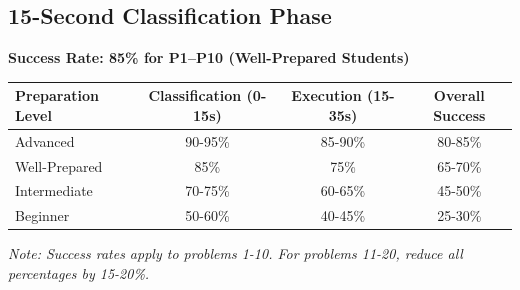 \documentclass{article}
\begin{document}
\newpage

\subsection{15-Second Classification Phase}
{\footnotesize\textcolor{timegreen}{}}\quad\textbf{Success Rate: 85\% for P1--P10 (Well-Prepared Students)}\\
\hypertarget{classify-15}{}

\begin{tcolorbox}[colback=blue!5!white,colframe=blue!75!black,title={\textbf{Success Rate Variations by Preparation Level}}]
\begin{center}
\begin{tabular}{|l|c|c|c|}
\hline
\textbf{Preparation Level} & \textbf{Classification (0-15s)} & \textbf{Execution (15-35s)} & \textbf{Overall Success} \\
\hline
Advanced & 90-95\% & 85-90\% & 80-85\% \\
Well-Prepared & 85\% & 75\% & 65-70\% \\
Intermediate & 70-75\% & 60-65\% & 45-50\% \\
Beginner & 50-60\% & 40-45\% & 25-30\% \\
\hline
\end{tabular}
\end{center}
\textit{Note: Success rates apply to problems 1-10. For problems 11-20, reduce all percentages by 15-20\%.}
\end{tcolorbox}
\end{document}
